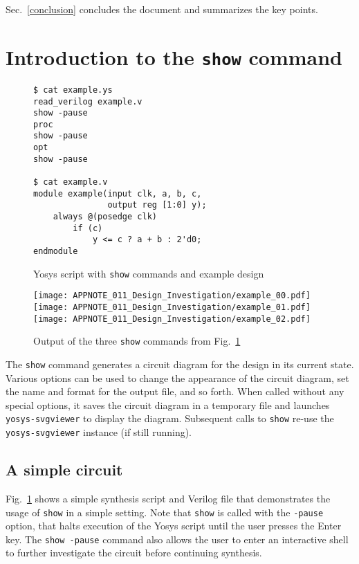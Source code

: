 \documentclass[9pt,technote,a4paper]{IEEEtran}
\begin{document}
Sec.~\ref{conclusion} concludes the document and summarizes the key points.

\section{Introduction to the {\tt show} command}
\label{intro_show}

\begin{figure}[b]
\begin{lstlisting}
$ cat example.ys
read_verilog example.v
show -pause
proc
show -pause
opt
show -pause

$ cat example.v
module example(input clk, a, b, c,
               output reg [1:0] y);
    always @(posedge clk)
        if (c)
            y <= c ? a + b : 2'd0;
endmodule
\end{lstlisting}
\caption{Yosys script with {\tt show} commands and example design}
\label{example_src}
\end{figure}

\begin{figure}[b!]
\texttt{[image: APPNOTE\_011\_Design\_Investigation/example\_00.pdf]}
\texttt{[image: APPNOTE\_011\_Design\_Investigation/example\_01.pdf]}
\texttt{[image: APPNOTE\_011\_Design\_Investigation/example\_02.pdf]}
\caption{Output of the three {\tt show} commands from Fig.~\ref{example_src}}
\label{example_out}
\end{figure}

The {\tt show} command generates a circuit diagram for the design in its
current state. Various options can be used to change the appearance of the
circuit diagram, set the name and format for the output file, and so forth.
When called without any special options, it saves the circuit diagram in
a temporary file and launches {\tt yosys-svgviewer} to display the diagram.
Subsequent calls to {\tt show} re-use the {\tt yosys-svgviewer} instance
(if still running).

\subsection{A simple circuit}

Fig.~\ref{example_src} shows a simple synthesis script and Verilog file that
demonstrates the usage of {\tt show} in a simple setting. Note that {\tt show}
is called with the {\tt -pause} option, that halts execution of the Yosys
script until the user presses the Enter key. The {\tt show -pause} command
also allows the user to enter an interactive shell to further investigate the
circuit before continuing synthesis.
\end{document}
